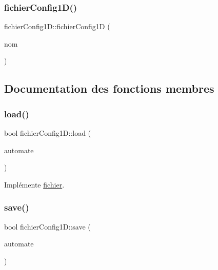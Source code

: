 \subsubsection{\texorpdfstring{fichier\+Config1\+D()}{fichierConfig1D()}}
{\footnotesize\ttfamily fichier\+Config1\+D\+::fichier\+Config1D (\begin{DoxyParamCaption}\item[{const std\+::string}]{nom }\end{DoxyParamCaption})\hspace{0.3cm}{\ttfamily [inline]}}



\subsection{Documentation des fonctions membres}
\mbox{\label{classfichier_config1_d_a598c6ad0c9c16735b6c5843198dcc682}} 
\subsubsection{\texorpdfstring{load()}{load()}}
{\footnotesize\ttfamily bool fichier\+Config1\+D\+::load (\begin{DoxyParamCaption}\item[{const \mbox{\hyperlink{class_cellular_automata}{Cellular\+Automata}} $\ast$}]{automate }\end{DoxyParamCaption})\hspace{0.3cm}{\ttfamily [virtual]}}



Implémente \mbox{\hyperlink{classfichier_a6c246db929cf6532eb3f12c2b39574d5}{fichier}}.

\mbox{\label{classfichier_config1_d_a759fa0735b22b3f5cceeb0fb414fc056}} 
\subsubsection{\texorpdfstring{save()}{save()}}
{\footnotesize\ttfamily bool fichier\+Config1\+D\+::save (\begin{DoxyParamCaption}\item[{const \mbox{\hyperlink{class_cellular_automata}{Cellular\+Automata}} \&}]{automate }\end{DoxyParamCaption})\hspace{0.3cm}{\ttfamily [virtual]}}



